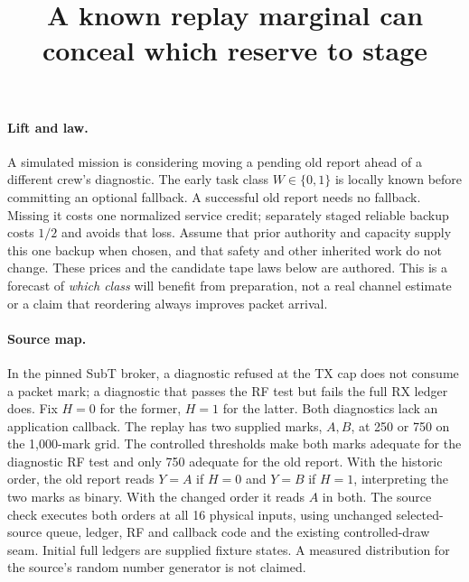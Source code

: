 \documentclass[11pt]{article}
\title{A known replay marginal can conceal which reserve to stage}
\begin{document}
\maketitle
\paragraph{Lift and law.}
A simulated mission is considering moving a pending old report
ahead of a different crew's diagnostic. The early task class
\(W\in\{0,1\}\) is locally known before committing an optional
fallback. A successful old report needs no fallback. Missing it
costs one normalized service credit; separately staged reliable
backup costs \(1/2\) and avoids that loss. Assume that prior
authority and capacity supply this one backup when chosen, and
that safety and other inherited work do not change.
These prices and the candidate tape laws below are authored.
This is a forecast of \emph{which class} will benefit from
preparation, not a real channel estimate or a claim that reordering
always improves packet arrival.

\paragraph{Source map.}
In the pinned SubT broker, a diagnostic refused at the TX cap does
not consume a packet mark; a diagnostic that passes the RF test
but fails the full RX ledger does. Fix \(H=0\) for the former,
\(H=1\) for the latter. Both diagnostics lack an application
callback. The replay has two supplied marks, \(A,B\), at 250 or
750 on the 1,000-mark grid. The controlled thresholds make both
marks adequate for the diagnostic RF test and only 750 adequate
for the old report. With the historic order, the old report reads
\(Y=A\) if \(H=0\) and \(Y=B\) if \(H=1\), interpreting the two
marks as binary. With the changed order it reads \(A\) in both.
The source check executes both orders at all 16 physical inputs,
using unchanged selected-source queue, ledger, RF and callback
code and the existing controlled-draw seam. Initial full ledgers
are supplied fixture states. A measured distribution for the
source's random number generator is not claimed.
\end{document}
